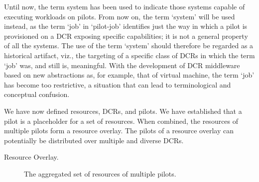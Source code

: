 \documentclass{sig-alternate}
\begin{document}
Until now, the term \pilotjob system has been used to indicate those systems
capable of executing workloads on pilots. From now on, the term `\pilot system'
will be used instead, as the term `job' in `pilot-job' identifies just the way
in which a pilot is provisioned on a DCR exposing specific capabilities; it is
not a general property of all the \pilotjob systems. The use of the term
`\pilotjob system' should therefore be regarded as a historical artifact, viz.,
the targeting of a specific class of DCRs in which the term `job' was, and still
is, meaningful. With the development of DCR middleware based on new abstractions
as, for example, that of virtual machine, the term `job' has become too
restrictive, a situation that can lead to terminological and conceptual
confusion.




We have now defined resources, DCRs, and pilots. We have established that a
pilot is a placeholder for a set of resources. When combined, the resources of
multiple pilots form a resource overlay. The pilots of a resource overlay can
potentially be distributed over multiple and diverse DCRs.



\begin{description}
\item[Resource Overlay.] The aggregated set of resources of multiple pilots.
\end{description}
\end{document}

